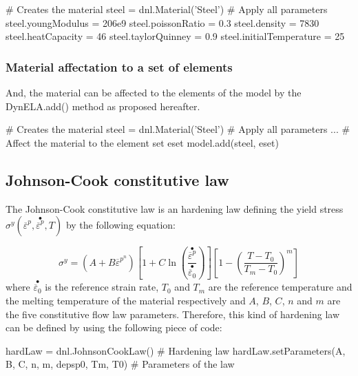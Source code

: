 \begin{PythonListing}
# Creates the material
steel = dnl.Material('Steel')
# Apply all parameters
steel.youngModulus = 206e9
steel.poissonRatio = 0.3
steel.density = 7830
steel.heatCapacity = 46
steel.taylorQuinney = 0.9
steel.initialTemperature = 25
\end{PythonListing}

\subsubsection{Material affectation to a set of elements}

And, the material can be affected to the elements of the model by the \textsf{DynELA.add()} method as proposed hereafter.

\begin{PythonListing}
# Creates the material
steel = dnl.Material('Steel')
# Apply all parameters
...
# Affect the material to the element set eset
model.add(steel, eset)
\end{PythonListing}

\subsection{Johnson-Cook constitutive law}

The Johnson-Cook constitutive law is an hardening law defining the yield stress $\sigma^{y}(\overline{\varepsilon}^{p},\stackrel{\bullet}{\overline{\varepsilon}^{p}},T)$ by the following equation:

\begin{equation}
\sigma^{y}=\left(A+B\overline{\varepsilon}^{p^{n}}\right)\left[1+C\ln\left(\frac{\stackrel{\bullet}{\overline{\varepsilon}^{p}}}{\stackrel{\bullet}{\overline{\varepsilon}_{0}}}\right)\right]\left[1-\left(\frac{T-T_{0}}{T_{m}-T_{0}}\right)^{m}\right]
\end{equation}
where $\stackrel{\bullet}{\overline{\varepsilon}_{0}}$ is the reference strain rate, $T_{0}$ and $T_{m}$ are the reference temperature and the melting temperature of the material respectively and $A$, $B$, $C$, $n$ and $m$ are the five constitutive flow law parameters. Therefore, this kind of hardening law can be defined by using the following piece of code:

\begin{PythonListing}
hardLaw = dnl.JohnsonCookLaw()                       # Hardening law
hardLaw.setParameters(A, B, C, n, m, depsp0, Tm, T0) # Parameters of the law
\end{PythonListing}

